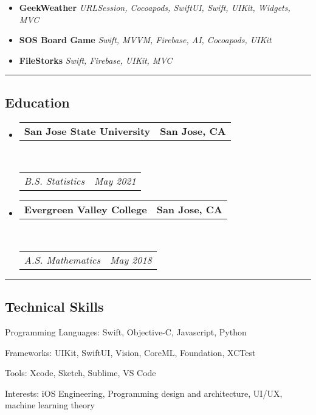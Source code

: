 \documentclass[9pt,letterpaper]{article}
\makeatletter
\newenvironment{indentsection}[1]%
{\begin{list}{}%
	{\setlength{\leftmargin}{#1}}%
	\item[]%
}
{\end{list}}
\newcommand{\headerrow}[2]
{\begin{tabular*}{\linewidth}{l@{\extracolsep{\fill}}r}
	#1 &
	#2 \\
\end{tabular*}}
\makeatother
\begin{document}
\begin{itemize}
	\parskip=0.1em
	\item {\textbf{GeekWeather}} \hfill
	{\emph{URLSession, Cocoapods, SwiftUI, Swift, UIKit, Widgets, MVC}}
	\item {\textbf{SOS Board Game}} \hfill
	{\emph{Swift, MVVM, Firebase, AI, Cocoapods, UIKit}}
	\item {\textbf{FileStorks}} \hfill
	{\emph{Swift, Firebase, UIKit, MVC}}
\end{itemize}


\hrule
\vspace{-0.4em}
\subsection*{Education}

\begin{itemize}
	\parskip=0.1em

	\item
	\headerrow
		{\textbf{San Jose State University}}
		{\textbf{San Jose, CA}}
	\\
	\headerrow
		{\emph{B.S. Statistics}}
		{\emph{May 2021}}
	\item
	\headerrow
		{\textbf{Evergreen Valley College}}
		{\textbf{San Jose, CA}}
	\\
	\headerrow
		{\emph{A.S. Mathematics}}
		{\emph{May 2018}}

\end{itemize}

\hrule
\vspace{-0.4em}
\subsection*{Technical Skills}

\begin{indentsection}{\parindent}
\begin{description*}
	\item[Programming Languages:]
	Swift, Objective-C, Javascript, Python
	\item[Frameworks:]
	UIKit, SwiftUI, Vision, CoreML, Foundation, XCTest
	\item[Tools:]
	Xcode, Sketch, Sublime, VS Code
	\item[Interests:]
	iOS Engineering, Programming design and architecture, UI/UX, machine learning theory
\end{description*}
\end{indentsection}
\end{document}
